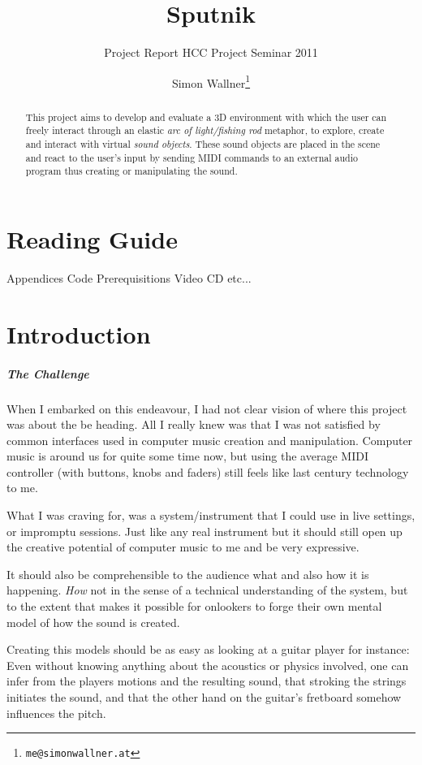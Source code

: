 \documentclass[10pt,a4paper]{scrartcl}
\title{Sputnik}
\subtitle{Project Report HCC Project Seminar 2011}
\author{Simon Wallner\footnote{\texttt{me@simonwallner.at}}}
\begin{document}
\maketitle

\begin{abstract}
This project aims to develop and evaluate a 3D environment with which the user can freely interact through an elastic \emph{arc of light/fishing rod} metaphor, to explore, create and interact with virtual \emph{sound objects}. These sound objects are placed in the scene and react to the user's input by sending MIDI commands to an external audio program thus creating or manipulating the sound.

\end{abstract}

\section{Reading Guide}
Appendices
Code
Prerequisitions
Video
CD
etc...


\section{Introduction}
\subparagraph{The Challenge}
When I embarked on this endeavour, I had not clear vision of where this project was about the be heading. All I really knew was that I was not satisfied by common interfaces used in computer music creation and manipulation. Computer music is around us for quite some time now, but using the average MIDI controller (with buttons, knobs and faders) still feels like last century technology to me. 

What I was craving for, was a system/instrument that I could use in live settings, or impromptu sessions. Just like any real instrument but it should still open up the creative potential of computer music to me and be very expressive.

It should also be comprehensible to the audience what and also how it is happening. \emph{How} not in the sense of a technical understanding of the system, but to the extent that makes it possible for onlookers to forge their own mental model of how the sound is created. 

Creating this models should be as easy as looking at a guitar player for instance: Even without knowing anything about the acoustics or physics involved, one can infer from the players motions and the resulting sound, that stroking the strings initiates the sound, and that the other hand on the guitar's fretboard somehow influences the pitch.
\end{document}
